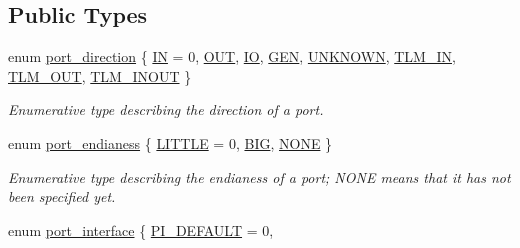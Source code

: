 \subsection*{Public Types}
\begin{DoxyCompactItemize}
\item 
enum \hyperlink{structport__o_adb254df5665ff28b0769491cc3899fd5}{port\+\_\+direction} \{ \newline
\hyperlink{structport__o_adb254df5665ff28b0769491cc3899fd5aa135fbd4d182c73be50d31f88e981284}{IN} = 0, 
\hyperlink{structport__o_adb254df5665ff28b0769491cc3899fd5ab3bfd4c2f6c68477c8c78a747e879f18}{O\+UT}, 
\hyperlink{structport__o_adb254df5665ff28b0769491cc3899fd5a1a30314caccd0c640b1703a56df5712a}{IO}, 
\hyperlink{structport__o_adb254df5665ff28b0769491cc3899fd5a1269ba4a4593962d3d6f4665e2d44f9b}{G\+EN}, 
\newline
\hyperlink{structport__o_adb254df5665ff28b0769491cc3899fd5a98736d3313a3503c8c11633bef7fd192}{U\+N\+K\+N\+O\+WN}, 
\hyperlink{structport__o_adb254df5665ff28b0769491cc3899fd5a7150377b458095cf92ef59bd6f772074}{T\+L\+M\+\_\+\+IN}, 
\hyperlink{structport__o_adb254df5665ff28b0769491cc3899fd5a867884fd1b73b0d8a062cd76f10673db}{T\+L\+M\+\_\+\+O\+UT}, 
\hyperlink{structport__o_adb254df5665ff28b0769491cc3899fd5a26a8eb84646e49d464cd4e456ede4324}{T\+L\+M\+\_\+\+I\+N\+O\+UT}
 \}\begin{DoxyCompactList}\small\item\em Enumerative type describing the direction of a port. \end{DoxyCompactList}
\item 
enum \hyperlink{structport__o_a7f16c53245215df0064e1b8ef27a36e3}{port\+\_\+endianess} \{ \hyperlink{structport__o_a7f16c53245215df0064e1b8ef27a36e3ae71b06dcf0b0e35a68aa05cf6cade7ea}{L\+I\+T\+T\+LE} = 0, 
\hyperlink{structport__o_a7f16c53245215df0064e1b8ef27a36e3a569bdde4b51179382d72de542281bb24}{B\+IG}, 
\hyperlink{structport__o_a7f16c53245215df0064e1b8ef27a36e3a3fd0ea465e803d52c8519e19ea27ecab}{N\+O\+NE}
 \}\begin{DoxyCompactList}\small\item\em Enumerative type describing the endianess of a port; N\+O\+NE means that it has not been specified yet. \end{DoxyCompactList}
\item 
enum \hyperlink{structport__o_a37d2e6a450aea997028478f5bfb4e1f6}{port\+\_\+interface} \{ \newline
\hyperlink{structport__o_a37d2e6a450aea997028478f5bfb4e1f6a3c3ea0d776e7385e41b44f8d2e920d46}{P\+I\+\_\+\+D\+E\+F\+A\+U\+LT} = 0, 

\end{DoxyCompactItemize}
